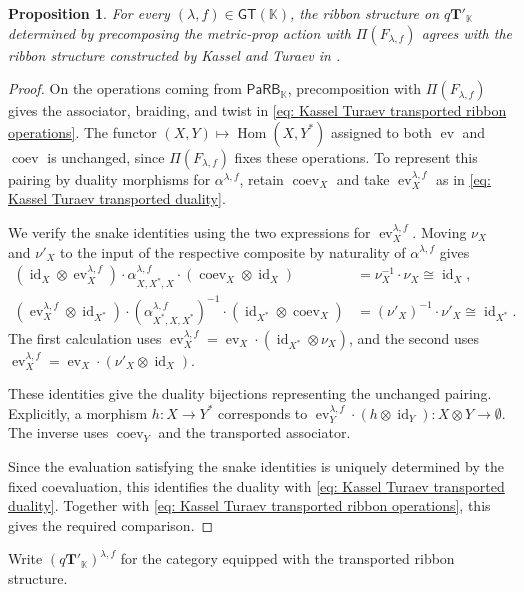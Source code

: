 \documentclass{amsart}
\newcommand{\bT}{\mathbf{T}}
\newcommand{\kk}{\mathbb{K}}    %
\newcommand{\PaRB}{\mathsf{PaRB}}
\newcommand{\id}{\operatorname{id}}
\newcommand{\Hom}{\operatorname{Hom}}
\newcommand{\ev}{\operatorname{ev}}
\newcommand{\coev}{\operatorname{coev}}
\newcommand{\gt}{\mathsf{GT}}
\newtheorem{prop}[theorem]{Proposition}%
\theoremstyle{definition}
\numberwithin{equation}{section}
\begin{document}
\begin{prop}
\label{prop: comparison with KT action}
For every $(\lambda,f)\in\gt(\kk)$, the ribbon structure on
$q\bT'_{\kk}$ determined by precomposing the metric-prop action
with $\Pi(F_{\lambda,f})$ agrees with the ribbon structure
constructed by Kassel and Turaev in
\cite[Appendix~D]{KT_Tangles}.
\end{prop}

\begin{proof}
On the operations coming from $\PaRB_{\kk}$, precomposition
with $\Pi(F_{\lambda,f})$ gives the associator, braiding, and
twist in
\eqref{eq: Kassel Turaev transported ribbon operations}. The functor $(X,Y)\mapsto\Hom(X,Y^*)$ assigned to both
$\ev$ and $\coev$ is unchanged, since $\Pi(F_{\lambda,f})$
fixes these operations. To represent this pairing by duality
morphisms for $\alpha^{\lambda,f}$, retain $\coev_X$ and
take $\ev_X^{\lambda,f}$ as in
\eqref{eq: Kassel Turaev transported duality}.

We verify the snake identities using the two expressions for
$\ev_X^{\lambda,f}$. Moving $\nu_X$ and $\nu'_X$ to the input
of the respective composite by naturality of
$\alpha^{\lambda,f}$ gives
\[
\begin{aligned}
(\id_X\otimes\ev_X^{\lambda,f})
\cdot\alpha^{\lambda,f}_{X,X^*,X}
\cdot(\coev_X\otimes\id_X)
&=\nu_X^{-1}\cdot\nu_X\cong\id_X,\\
(\ev_X^{\lambda,f}\otimes\id_{X^*})
\cdot(\alpha^{\lambda,f}_{X^*,X,X^*})^{-1}
\cdot(\id_{X^*}\otimes\coev_X)
&=(\nu'_X)^{-1}\cdot\nu'_X\cong\id_{X^*}.
\end{aligned}
\]
The first calculation uses
$\ev_X^{\lambda,f}=\ev_X\cdot(\id_{X^*}\otimes\nu_X)$,
and the second uses
$\ev_X^{\lambda,f}=\ev_X\cdot(\nu'_X\otimes\id_X)$.

These identities give the duality bijections representing the
unchanged pairing. Explicitly, a morphism $h\colon X\to Y^*$
corresponds to
$\ev_Y^{\lambda,f}\cdot(h\otimes\id_Y)\colon
X\otimes Y\to\emptyset$.
The inverse uses $\coev_Y$ and the transported associator.

Since the evaluation satisfying the snake identities is uniquely
determined by the fixed coevaluation, this identifies the duality
with \eqref{eq: Kassel Turaev transported duality}.
Together with
\eqref{eq: Kassel Turaev transported ribbon operations}, this
gives the required comparison.
\end{proof}

Write $(q\bT'_{\kk})^{\lambda,f}$ for the category equipped
with the transported ribbon structure.
\end{document}
